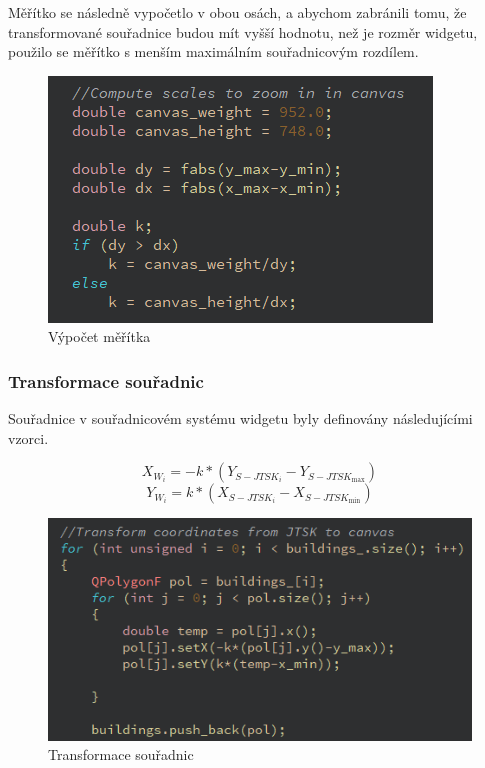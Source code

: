 \documentclass[11pt]{article}
\begin{document}
	Měřítko se následně vypočetlo v obou osách, a abychom zabránili tomu, že transformované souřadnice budou mít vyšší hodnotu, než je rozměr widgetu, použilo se měřítko s menším maximálním souřadnicovým rozdílem.
	
	\begin{figure}[htbh]
		\centering
		\includegraphics[scale=1]{images/U2_problem_meritko2.png} 
		\caption{Výpočet měřítka}
		\label{fig:problem_scale2}
	\end{figure} 
	
	\subsubsection{Transformace souřadnic}
	Souřadnice v souřadnicovém systému widgetu byly definovány následujícími vzorci.
	
	\begin{equation}
		X_{W_{i}}=-k *\left(Y_{S-J T S K_{i}}-Y_{S-J T S K_{\max }}\right)
	\end{equation}
	\begin{equation}
		Y_{W_{i}}=k *\left(X_{S-J T S K_{i}}-X_{S-J T S K_{\min }}\right)
	\end{equation}
	
	\begin{figure}[htbh]
		\centering
		\includegraphics[scale=1]{images/U2_problem_transformace.png} 
		\caption{Transformace souřadnic}
		\label{fig:problem_transformation}
	\end{figure} 
	
\end{document}
